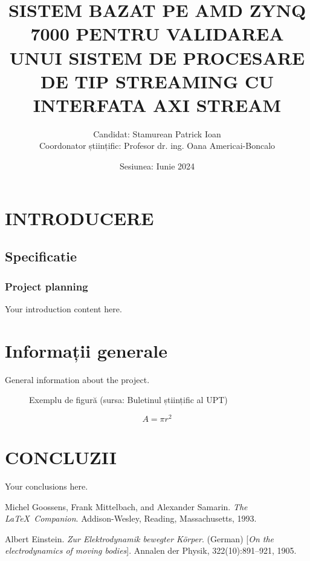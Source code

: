 \documentclass[12pt]{article}
\title{\uppercase{\bfseries{Sistem bazat pe AMD ZYNQ 7000 pentru validarea unui sistem de procesare de tip streaming cu interfata AXI stream}}}
\author{Candidat: Stamurean Patrick Ioan\\Coordonator științific: Profesor dr. ing. Oana Americai-Boncalo}
\date{Sesiunea: Iunie 2024}
\begin{document}
\maketitle

\newpage
\section{\uppercase{Introducere}}
\subsection{Specificatie}
\subsubsection{Project planning}
Your introduction content here.

\section{Informații generale}
General information about the project.


\begin{figure}[ht]
\centering
\caption{Exemplu de figură (sursa: Buletinul științific al UPT)}
\label{fig:exampleFigure}
\end{figure}


\begin{equation}
A=\pi r^{2}
\label{eq:circleArea}
\end{equation}


\section{\uppercase{Concluzii}}
Your conclusions here.

\begin{thebibliography}{9}
Michel Goossens, Frank Mittelbach, and Alexander Samarin. 
\textit{The \LaTeX\ Companion}. 
Addison-Wesley, Reading, Massachusetts, 1993.
 
Albert Einstein. 
\textit{Zur Elektrodynamik bewegter K{\"o}rper}. (German) 
[\textit{On the electrodynamics of moving bodies}]. 
Annalen der Physik, 322(10):891–921, 1905.
\end{thebibliography}
\end{document}

